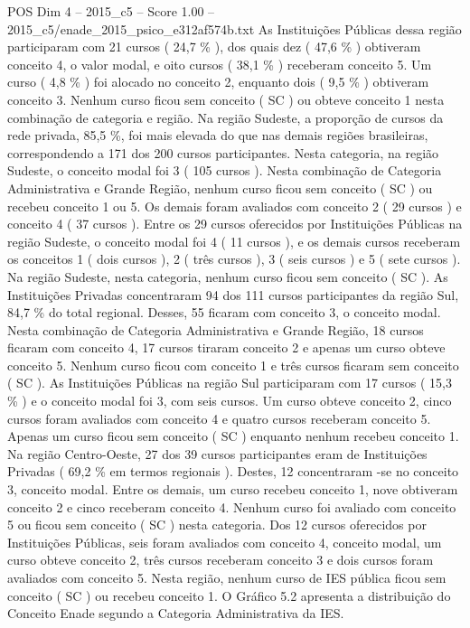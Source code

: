 \begin{textsample}{POS Dim 4 – 2015\_c5 – Score 1.00 – 2015\_c5/enade\_2015\_psico\_e312af574b.txt}
As Instituições Públicas dessa região participaram com 21 cursos ( 24,7 \% ), dos quais dez ( 47,6 \% ) obtiveram conceito 4, o valor modal, e oito cursos ( 38,1 \% ) receberam conceito 5.
Um curso ( 4,8 \% ) foi alocado no conceito 2, enquanto dois ( 9,5 \% ) obtiveram conceito 3.
Nenhum curso ficou sem conceito ( SC ) ou obteve conceito 1 nesta combinação de categoria e região.
Na região Sudeste, a proporção de cursos da rede privada, 85,5 \%, foi mais elevada do que nas demais regiões brasileiras, correspondendo a 171 dos 200 cursos participantes.
Nesta categoria, na região Sudeste, o conceito modal foi 3 ( 105 cursos ).
Nesta combinação de Categoria Administrativa e Grande Região, nenhum curso ficou sem conceito ( SC ) ou recebeu conceito 1 ou 5.
Os demais foram avaliados com conceito 2 ( 29 cursos ) e conceito 4 ( 37 cursos ).
Entre os 29 cursos oferecidos por Instituições Públicas na região Sudeste, o conceito modal foi 4 ( 11 cursos ), e os demais cursos receberam os conceitos 1 ( dois cursos ), 2 ( três cursos ), 3 ( seis cursos ) e 5 ( sete cursos ).
Na região Sudeste, nesta categoria, nenhum curso ficou sem conceito ( SC ).
As Instituições Privadas concentraram 94 dos 111 cursos participantes da região Sul, 84,7 \% do total regional.
Desses, 55 ficaram com conceito 3, o conceito modal.
Nesta combinação de Categoria Administrativa e Grande Região, 18 cursos ficaram com conceito 4, 17 cursos tiraram conceito 2 e apenas um curso obteve conceito 5.
Nenhum curso ficou com conceito 1 e três cursos ficaram sem conceito ( SC ).
As Instituições Públicas na região Sul participaram com 17 cursos ( 15,3 \% ) e o conceito modal foi 3, com seis cursos.
Um curso obteve conceito 2, cinco cursos foram avaliados com conceito 4 e quatro cursos receberam conceito 5.
Apenas um curso ficou sem conceito ( SC ) enquanto nenhum recebeu conceito 1.
Na região Centro-Oeste, 27 dos 39 cursos participantes eram de Instituições Privadas ( 69,2 \% em termos regionais ).
Destes, 12 concentraram -se no conceito 3, conceito modal.
Entre os demais, um curso recebeu conceito 1, nove obtiveram conceito 2 e cinco receberam conceito 4.
Nenhum curso foi avaliado com conceito 5 ou ficou sem conceito ( SC ) nesta categoria.
Dos 12 cursos oferecidos por Instituições Públicas, seis foram avaliados com conceito 4, conceito modal, um curso obteve conceito 2, três cursos receberam conceito 3 e dois cursos foram avaliados com conceito 5.
Nesta região, nenhum curso de IES pública ficou sem conceito ( SC ) ou recebeu conceito 1.
O Gráfico 5.2 apresenta a distribuição do Conceito Enade segundo a Categoria Administrativa da IES.

\end{textsample}
